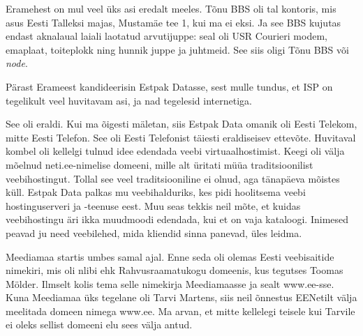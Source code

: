 
Eramehest on mul veel üks asi eredalt meeles. Tõnu BBS oli tal 
kontoris, mis asus Eesti Talleksi majas, Mustamäe tee 1, kui ma ei 
eksi. Ja see BBS kujutas endast aknalaual laiali laotatud arvutijuppe: seal 
oli USR Courieri modem, emaplaat, toiteplokk 
ning hunnik juppe ja juhtmeid. See siis oligi Tõnu BBS või \emph{node}.

Pärast Erameest kandideerisin Estpak Datasse, sest mulle 
tundus, et ISP on tegelikult veel huvitavam asi, ja nad 
tegelesid internetiga.


See oli eraldi. Kui ma õigesti mäletan, siis Estpak Data omanik oli 
Eesti Telekom, mitte Eesti Telefon. See oli Eesti Telefonist täiesti eraldiseisev ettevõte. Huvitaval kombel oli kellelgi 
tulnud idee edendada veebi 
virtuaalhostimist. Keegi oli välja mõelnud neti.ee-nimelise 
domeeni, mille alt üritati müüa traditsioonilist 
veebihostingut. Tollal see veel traditsiooniline ei olnud, aga 
tänapäeva mõistes küll. Estpak Data palkas mu veebihalduriks,
kes pidi hoolitsema veebi hostinguserveri ja -teenuse eest. Muu seas tekkis 
neil mõte, et kuidas veebihostingu äri ikka muudmoodi 
edendada, kui et on vaja kataloogi. Inimesed peavad ju 
need veebilehed, mida kliendid sinna panevad, üles leidma.


Meediamaa startis umbes samal ajal. Enne seda oli olemas 
Eesti veebisaitide nimekiri, mis oli nlibi ehk 
Rahvusraamatukogu domeenis, kus tegutses Toomas 
Mölder. Ilmselt kolis tema
selle nimekirja Meediamaasse ja sealt www.ee-sse. Kuna 
Meediamaa üks tegelane oli Tarvi Martens, siis neil 
õnnestus EENetilt välja meelitada domeen nimega 
www.ee. Ma arvan, et mitte kellelegi 
teisele kui Tarvile ei oleks sellist domeeni elu sees välja antud.

